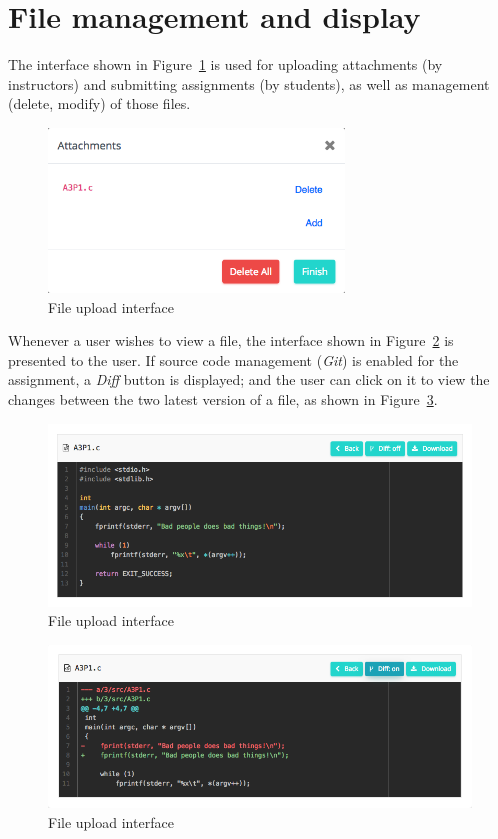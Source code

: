 \section{File management and display}

The interface shown in Figure~\ref{fig:FILE_UPLOAD} is used for uploading
attachments (by instructors) and submitting assignments (by students), as well
as management (delete, modify) of those files.

\begin{figure}[H]
    \centering
        \includegraphics[width=0.7\textwidth]{figures/file-upload}
    \caption{File upload interface}
    \label{fig:FILE_UPLOAD}
\end{figure}

Whenever a user wishes to view a file, the interface shown in
Figure~\ref{fig:VIEW_FILE} is presented to the user. If source code management
(\emph{Git}) is enabled for the assignment, a \emph{Diff} button is displayed;
and the user can click on it to view the changes between the two latest
version of a file, as shown in Figure~\ref{fig:VIEW_FILE_DIFF}.

\begin{figure}[H]
    \centering
        \includegraphics[width=1.0\textwidth]{figures/view-file}
    \caption{File upload interface}
    \label{fig:VIEW_FILE}
\end{figure}

\begin{figure}[H]
    \centering
        \includegraphics[width=1.0\textwidth]{figures/view-file-diff}
    \caption{File upload interface}
    \label{fig:VIEW_FILE_DIFF}
\end{figure}


